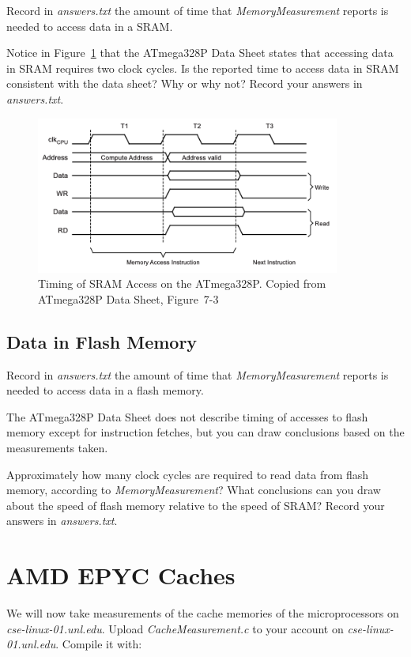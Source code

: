 Record in \textit{answers.txt} the amount of time that
\textit{MemoryMeasurement}  reports is needed to access data in a SRAM.

Notice in Figure~\ref{fig:SramTiming} that the ATmega328P Data Sheet states
that accessing data in SRAM requires two clock cycles. Is the reported time to
access data in SRAM consistent with the data sheet? Why or why not? Record your
answers in \textit{answers.txt}.

\begin{figure}
    \centering
    \includegraphics[width=10cm]{ATmega328P_SramTiming}
    \caption{Timing of SRAM Access on the ATmega328P. \tiny Copied from ATmega328P Data Sheet, Figure~7-3 \label{fig:SramTiming}}
\end{figure}

\subsection{Data in Flash Memory}

Record in \textit{answers.txt} the amount of time that
\textit{MemoryMeasurement} reports is needed to access data in a flash
memory.

The ATmega328P Data Sheet does not describe timing of accesses to flash memory
except for instruction fetches, but you can draw conclusions based on the
measurements taken.

Approximately how many clock cycles are required to read data from flash
memory, according to \textit{MemoryMeasurement}? What conclusions can you
draw about the speed of flash memory relative to the speed of SRAM? Record your
answers in \textit{answers.txt}.

\section{AMD EPYC Caches}

We will now take measurements of the cache memories of the microprocessors on
\textit{cse-linux-01.unl.edu}. Upload \textit{CacheMeasurement.c} to your account on
\textit{cse-linux-01.unl.edu}. Compile it with:

